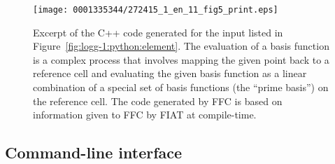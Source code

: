 \begin{figure}[!p]
\bwfig
\texttt{[image: 0001335344/272415\_1\_en\_11\_fig5\_print.eps]}
\caption{Excerpt of the C++ code generated for the input listed in
    Figure~\ref{fig:logg-1:python:element}. The evaluation of a basis
    function is a complex process that involves mapping the given
    point back to a reference cell and evaluating the given basis
    function as a linear combination of a special set of basis
    functions (the ``prime basis'') on the reference cell. The code
    generated by FFC is based on information given to FFC by FIAT at
    compile-time.}\label{fig:logg-1:elementcode}
\vspace*{4.2pc}
\end{figure}

\subsection{Command-line interface}

